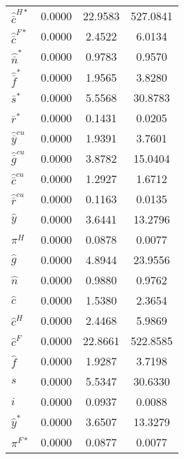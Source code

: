 \begin{center}
\begin{longtable}{lccc}
${\hat {\bar c}^{H*}}  $	 & 	       0.0000	 & 	      22.9583	 & 	     527.0841 \\ 
${\hat {\bar c}^{F*}}  $	 & 	       0.0000	 & 	       2.4522	 & 	       6.0134 \\ 
${\hat {\bar n}^*}     $	 & 	       0.0000	 & 	       0.9783	 & 	       0.9570 \\ 
${\hat {\bar f}^*}     $	 & 	       0.0000	 & 	       1.9565	 & 	       3.8280 \\ 
${\bar s^*}            $	 & 	       0.0000	 & 	       5.5568	 & 	      30.8783 \\ 
${\bar r^*}            $	 & 	       0.0000	 & 	       0.1431	 & 	       0.0205 \\ 
${\hat {\bar y}^{cu}}  $	 & 	       0.0000	 & 	       1.9391	 & 	       3.7601 \\ 
${\hat {\bar g}^{cu}}  $	 & 	       0.0000	 & 	       3.8782	 & 	      15.0404 \\ 
${\hat {\bar c}^{cu}}  $	 & 	       0.0000	 & 	       1.2927	 & 	       1.6712 \\ 
${\hat {\bar r}^{cu}}  $	 & 	       0.0000	 & 	       0.1163	 & 	       0.0135 \\ 
${\hat y}              $	 & 	       0.0000	 & 	       3.6441	 & 	      13.2796 \\ 
${\pi^H}               $	 & 	       0.0000	 & 	       0.0878	 & 	       0.0077 \\ 
${\hat g}              $	 & 	       0.0000	 & 	       4.8944	 & 	      23.9556 \\ 
${\hat n}              $	 & 	       0.0000	 & 	       0.9880	 & 	       0.9762 \\ 
${\hat c}              $	 & 	       0.0000	 & 	       1.5380	 & 	       2.3654 \\ 
${\hat c^H}            $	 & 	       0.0000	 & 	       2.4468	 & 	       5.9869 \\ 
${\hat c^F}            $	 & 	       0.0000	 & 	      22.8661	 & 	     522.8585 \\ 
${\hat f}              $	 & 	       0.0000	 & 	       1.9287	 & 	       3.7198 \\ 
${s}                   $	 & 	       0.0000	 & 	       5.5347	 & 	      30.6330 \\ 
${i}                   $	 & 	       0.0000	 & 	       0.0937	 & 	       0.0088 \\ 
${\hat y^*}            $	 & 	       0.0000	 & 	       3.6507	 & 	      13.3279 \\ 
${\pi^{F*}}            $	 & 	       0.0000	 & 	       0.0877	 & 	       0.0077 \\ 

\end{longtable}
\end{center}
